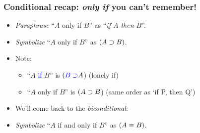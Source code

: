 \begin{frame}
  \frametitle{Conditional recap: \emph{only if} you can't remember!}

  \begin{itemize}[<+->]
  \item \emph{Paraphrase} ``$A$ only if $B$'' as
  ``\emph{if $A$ then $B$}''.
  \item \emph{Symbolize} ``$A$ only if $B$'' as
  \emph{$(A \supset B)$}.
  \item Note: 
    \begin{itemize}
 \item ``$A$ \textcolor{blue}{if} $B$'' is $(\textcolor{blue}{B \supset} A$) (lonely if) \\
  \item ``$A$ only if $B$'' is $(A \supset B$) (same order as `if P, then Q')
    \end{itemize}

\bigskip

\item We'll come back to the \textit{biconditional}:
  \item[] \emph{Symbolize} ``$A$ if and only if $B$'' as
  \emph{$(A \equiv B)$}.
\end{itemize}
\end{frame}




